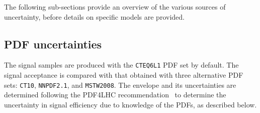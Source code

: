The following sub-sections provide an overview of the various sources of
uncertainty, before details on specific models are provided. 
%
%
%
%
\subsection{PDF uncertainties\label{sec:pdf-sets}}

\newcommand{\lcr}{Left: $\frac{\epsilon_{CTEQ6L1}}{\epsilon_{CT10}}$,
  center: $\frac{\epsilon_{CTEQ6L1}}{\epsilon_{MSTW08}}$, right:
  $\frac{\epsilon_{CTEQ6L1}}{\epsilon_{NNPDF2.1}}$}

The signal samples are produced with the \verb!CTEQ6L1! PDF set by
default. The signal acceptance is compared with that obtained with
three alternative PDF sets: \verb!CT10!, \verb!NNPDF2.1!, and
\verb!MSTW2008!. The envelope and its uncertainties are determined
following the PDF4LHC recommendation~\cite{pdf4lhc} to determine the
uncertainty in signal efficiency due to knowledge of the PDFs, as
described below.

